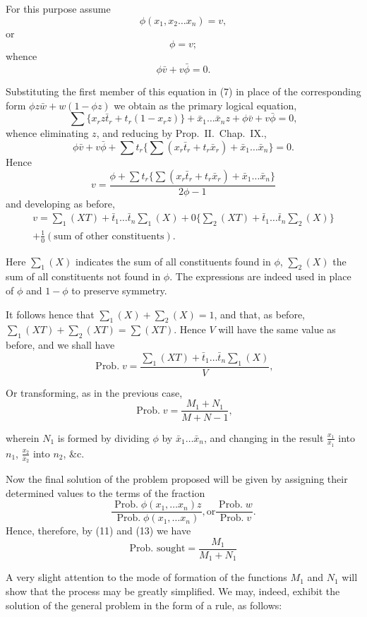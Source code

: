 \documentclass[oneside]{book}
\begin{document}
For this purpose assume
\[
\phi(x_1,x_2 \dotsc x_n)=v,
\]
or
\[
\phi = v ;
\]
whence
\[
\phi \bar{v} + v \bar{\phi} = 0.
\]

Substituting the first member of this equation in (7) in place of
the corresponding form $\phi z\bar{w}+w(1-\phi z)$ we obtain as the primary
logical equation,
\[
\sum \{x_r z \bar{t}_r + t_r(1-x_r z)\} + \bar{x}_1 \dotsc \bar{x}_n z + \phi \bar{v} + v \bar{\phi} = 0,
\]
whence eliminating $z$, and reducing by Prop.~II.\ Chap.~IX.,
\[
\phi \bar{v} + v \bar{\phi} + \sum t_r \{\sum (x_r\bar{t}_r + t_r\bar{x}_r) + \bar{x}_1 \dotsc \bar{x}_n\}=0.
\]
Hence
\[
v = \frac{\phi + \sum t_r \{\sum(x_r\bar{t}_r + t_r\bar{x}_r) + \bar{x}_1 \dotsc \bar{x}_n\} }{2\phi-1}
\]
and developing as before,
\[
\begin{split}
v = \sum\nolimits_1(XT)+\bar{t}_1\dotsc\bar{t}_n \sum\nolimits_1(X) + 0\{\sum\nolimits_2(XT)+\bar{t}_1\dotsc\bar{t}_n\sum\nolimits_2(X)\}
\\
+ \frac{1}{0}(\text{sum of other constituents}).
\end{split}  \tag{12}
\]

Here $\sum_1(X)$ indicates the sum of all constituents found in $\phi$,
$\sum_2(X)$ the sum of all constituents not found in $\phi$. The expressions
are indeed used in place of $\phi$ and $1-\phi$ to preserve symmetry.

It follows hence that $\sum_1(X)+\sum_2(X)=1$, and that, as before,
$\sum_1(XT)+\sum_2(XT) = \sum(X T)$. Hence $V$ will have the
same value as before, and we shall have
\[
\operatorname{Prob. } v
= \frac{\sum_1(XT)+\bar{t}_1\dotsc\bar{t}_n \sum_1(X)}{V},
\]

Or transforming, as in the previous case,
\[
\operatorname{Prob. } v = \frac{M_1+N_1}{M+N-1},  \tag{13}
\]

wherein $N_1$ is formed by dividing $\phi$ by $\bar{x}_1\dotsc\bar{x}_n$, and changing in
the result $\frac{x_1}{\bar{x}_1}$ into $n_1$,
$\frac{x_2}{\bar{x}_2}$ into $n_2$, \&c.

Now the final solution of the problem proposed will be given
by assigning their determined values to the terms of the fraction
\[
\frac{\operatorname{Prob. } \phi(x_1,\dotsc x_n)z}
     {\operatorname{Prob. } \phi(x_1,\dotsc x_n)}, \mathrm{ or }
\frac{\operatorname{Prob. } w}{\operatorname{Prob. } v}.
\]
Hence, therefore, by (11) and (13) we have
\[
\textrm{Prob. sought} = \frac{M_1}{M_1 + N_1}
\]

A very slight attention to the mode of formation of the functions
$M_1$ and $N_1$ will show that the process may be greatly simplified.
We may, indeed, exhibit the solution of the general
problem in the form of a rule, as follows:
\end{document}

